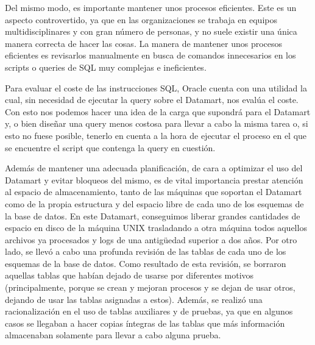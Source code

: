 \documentclass[a4paper, 12pt]{book}
\begin{document}
Del mismo modo, es importante mantener unos procesos eficientes. Este es un aspecto controvertido, ya que en las organizaciones se trabaja en equipos multidisciplinares y con gran número de personas, y no suele existir una única manera correcta de hacer las cosas. La manera de mantener unos procesos eficientes es revisarlos manualmente en busca de comandos innecesarios en los scripts o queries de SQL muy complejas e ineficientes.

Para evaluar el coste de las instrucciones SQL, Oracle cuenta con una utilidad la cual, sin necesidad de ejecutar la query sobre el Datamart, nos evalúa el coste. Con esto nos podemos hacer una idea de la carga que supondrá para el Datamart y, o bien diseñar una query menos costosa para llevar a cabo la misma tarea o, si esto no fuese posible, tenerlo en cuenta a la hora de ejecutar el proceso en el que se encuentre el script que contenga la query en cuestión.

Además de mantener una adecuada planificación, de cara a optimizar el uso del Datamart y evitar bloqueos del mismo, es de vital importancia prestar atención al espacio de almacenamiento, tanto de las máquinas que soportan el Datamart como de la propia estructura y del espacio libre de cada uno de los esquemas de la base de datos. En este Datamart, conseguimos liberar grandes cantidades de espacio en disco de la máquina UNIX trasladando a otra máquina todos aquellos archivos ya procesados y logs de una antigüedad superior a dos años. Por otro lado, se llevó a cabo una profunda revisión de las tablas de cada uno de los esquemas de la base de datos. Como resultado de esta revisión, se borraron aquellas tablas que habían dejado de usarse por diferentes motivos (principalmente, porque se crean y mejoran procesos y se dejan de usar otros, dejando de usar las tablas asignadas a estos). Además, se realizó una racionalización en el uso de tablas auxiliares y de pruebas, ya que en algunos casos se llegaban a hacer copias íntegras de las tablas que más información almacenaban solamente para llevar a cabo alguna prueba.


\end{document}
